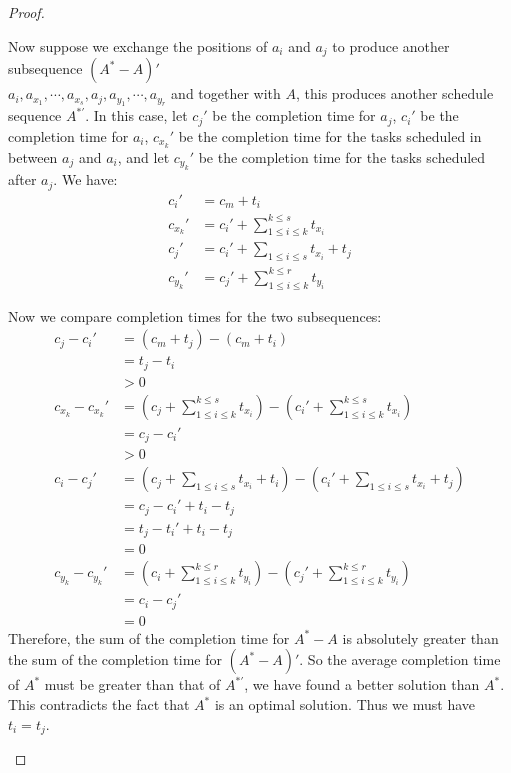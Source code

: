 \documentclass[11pt]{article}
\begin{document}
\begin{enumerate}
\begin{proof}
\begin{enumerate}
    Now suppose we exchange the positions of $a_i$ and $a_j$ to
    produce another subsequence $(A^*-A)'$\\
    $a_i,a_{x_1},\cdots,a_{x_s},a_j,a_{y_1},\cdots,a_{y_r}$ and
    together with $A$, this produces another schedule sequence $A^{*'}$. In this
    case, let $c_j'$ be the completion time for $a_j$, $c_i'$ be the
    completion time for $a_i$, $c_{x_k}'$ be
    the completion time for the tasks scheduled in between $a_j$ and
    $a_i$, and let $c_{y_k}'$ be the completion time for the tasks
    scheduled after $a_j$. We have:
    \begin{align}
      c_i' &= c_m + t_i\\
      c_{x_k}' &= c_i' + \sum_{1 \leq i \leq k}^{k \leq s}t_{x_i}\\
      c_j' &= c_i' + \sum_{1 \leq i \leq s}t_{x_i} + t_j\\
      c_{y_k}' &= c_j' + \sum_{1 \leq i \leq k}^{k \leq r}t_{y_i}
    \end{align}
    
    Now we compare completion times for the two subsequences:
    \begin{align}
      c_j - c_i' &= (c_m + t_j) - (c_m + t_i)\\
      &= t_j - t_i\\
      &> 0\\
      c_{x_k} - c_{x_k}' &= (c_j + \sum_{1 \leq i \leq k}^{k \leq
        s}t_{x_i}) - (c_i' + \sum_{1 \leq i \leq k}^{k \leq
        s}t_{x_i})\\ 
      &= c_j - c_i'\\
      &> 0\\
      c_i - c_j' &= (c_j + \sum_{1 \leq i \leq s}t_{x_i} + t_i) -
      (c_i' + \sum_{1 \leq i \leq s}t_{x_i} + t_j)\\ 
      &= c_j - c_i' + t_i - t_j\\
      &= t_j - t_i' + t_i - t_j\\
      &= 0\\
      c_{y_k} - c_{y_k}' &= (c_i + \sum_{1 \leq i \leq k}^{k \leq
        r}t_{y_i}) - (c_j' + \sum_{1 \leq i \leq k}^{k \leq
        r}t_{y_i})\\
      &= c_i - c_j'\\
      &= 0
    \end{align}
    Therefore, the sum of the completion time for $A^*-A$ is
    absolutely greater than the sum of the completion time for
    $(A^*-A)'$. So the average completion time of $A^*$ must be greater
    than that of $A^{*'}$, we have found a better solution than
    $A^*$. This contradicts the fact that $A^*$ is an optimal
    solution. Thus we must have $t_i = t_j$. 


\end{enumerate}
\end{proof}
\end{enumerate}
\end{document}
